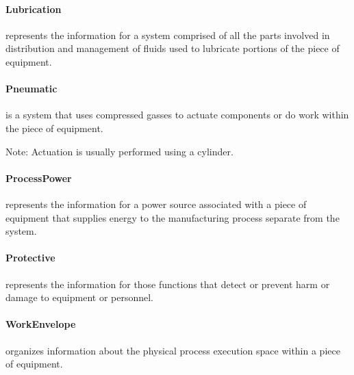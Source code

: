 \paragraph{Lubrication}\mbox{}
\label{sec:Lubrication}


 represents the information for a system comprised of all the parts involved in distribution and management of fluids used to lubricate portions of the piece of equipment.



\paragraph{Pneumatic}\mbox{}
\label{sec:Pneumatic}


 is a system that uses compressed gasses to actuate components or do work within the piece of equipment.

Note: Actuation is usually performed using a cylinder.



\paragraph{ProcessPower}\mbox{}
\label{sec:ProcessPower}


 represents the information for a power source associated with a piece of equipment that supplies energy to the manufacturing process separate from the  system.



\paragraph{Protective}\mbox{}
\label{sec:Protective}


 represents the information for those functions that detect or prevent harm or damage to equipment or personnel.



\paragraph{WorkEnvelope}\mbox{}
\label{sec:WorkEnvelope}


 organizes information about the physical process execution space within a piece of equipment.



